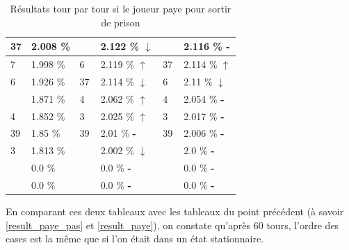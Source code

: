 \documentclass[letterpaper]{article}
\newcommand{\caseUp}[1][]{#1\textcolor[HTML]{008000}{$\mathbf{\uparrow}$}}
\newcommand{\caseStable}[1][]{#1\textcolor[HTML]{3779dd}{\textbf{-}}}
\newcommand{\caseDown}[1][]{#1\textcolor[HTML]{dd3737}{$\mathbf{\downarrow}$}}
\begin{document}
\begin{table}
\begin{tabular}{|l|l||l|l||l|l|}
	    \cellcolor[HTML]{FFC1C1} 37 & 2.008 \% & \cellcolor[HTML]{000000} \textcolor{white}{11} & 2.122 \% \caseDown[\hfill] & \cellcolor[HTML]{000000} \textcolor{white}{11} & 2.116 \% \caseStable[\hfill] \\ \hline 
	    \cellcolor[HTML]{1E90FF}  7 & 1.998 \% & \cellcolor[HTML]{E6E6FA}  6 & 2.119 \% \caseUp[\hfill] & \cellcolor[HTML]{FFC1C1} 37 & 2.114 \% \caseUp[\hfill] \\ \hline 
	    \cellcolor[HTML]{E6E6FA}  6 & 1.926 \% & \cellcolor[HTML]{FFC1C1} 37 & 2.114 \% \caseDown[\hfill] & \cellcolor[HTML]{E6E6FA} 6 & 2.11 \% \caseDown[\hfill] \\ \hline 
	    \cellcolor[HTML]{483D8B} \textcolor{white}{38} & 1.871 \% & \cellcolor[HTML]{A0522D}  4 & 2.062 \% \caseUp[\hfill] & \cellcolor[HTML]{A0522D} 4 & 2.054 \% \caseStable[\hfill] \\ \hline 
	    \cellcolor[HTML]{A0522D}  4 & 1.852 \% & \cellcolor[HTML]{EEEED1}  3 & 2.025 \% \caseUp[\hfill] & \cellcolor[HTML]{EEEED1} 3 & 2.017 \% \caseStable[\hfill] \\ \hline 
	    \cellcolor[HTML]{8B1A1A} 39 & 1.85 \%  & \cellcolor[HTML]{8B1A1A} 39 & 2.01 \% \caseStable[\hfill] & \cellcolor[HTML]{8B1A1A} 39 & 2.006 \% \caseStable[\hfill] \\ \hline 
	    \cellcolor[HTML]{EEEED1}  3 & 1.813 \% & \cellcolor[HTML]{483D8B} \textcolor{white}{38} & 2.002 \% \caseDown[\hfill] & \cellcolor[HTML]{483D8B} \textcolor{white}{38} & 2.0 \% \caseStable[\hfill] \\ \hline 
	    \cellcolor[HTML]{000000} \textcolor{white}{42} & 0.0 \%   & \cellcolor[HTML]{000000} \textcolor{white}{42} & 0.0 \% \caseStable[\hfill] & \cellcolor[HTML]{000000} \textcolor{white}{42} & 0.0 \% \caseStable[\hfill] \\ \hline 
	    \cellcolor[HTML]{000000} \textcolor{white}{43} & 0.0 \%   & \cellcolor[HTML]{000000} \textcolor{white}{43} & 0.0 \% \caseStable[\hfill] & \cellcolor[HTML]{000000} \textcolor{white}{43} & 0.0 \% \caseStable[\hfill] \\ \hline
	\end{tabular}
	\caption{Résultats tour par tour si le joueur paye pour 
	sortir de prison}
	\label{result_tour_paye}
      \end{table}
      En comparant ces deux tableaux avec les tableaux du point précédent 
      (à savoir \ref{result_paye_pas} et \ref{result_paye}), on constate
      qu'après 60 tours, l'ordre des cases est la même que si l'on était
      dans un état stationnaire.
    
\end{document}
